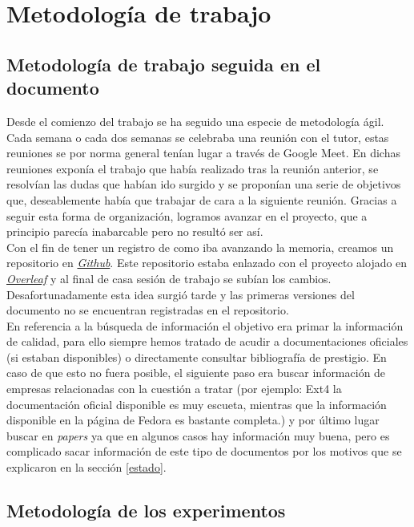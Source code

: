 \cleardoublepage
\clearpage{}

\chapter[Metodología de trabajo]{Metodología de trabajo}
\section{Metodología de trabajo seguida en el documento}
Desde el comienzo del trabajo se ha seguido una especie de metodología ágil. Cada semana o cada dos semanas se celebraba una reunión con el tutor, estas reuniones se por norma general tenían lugar a través de Google Meet. En dichas reuniones exponía el trabajo que había realizado tras la reunión anterior, se resolvían las dudas que habían ido surgido y se proponían una serie de objetivos que, deseablemente había que trabajar de cara a la siguiente reunión. Gracias a seguir esta forma de organización, logramos avanzar en el proyecto, que a principio parecía inabarcable pero no resultó ser así. \\

Con el fin de tener un registro de como iba avanzando la memoria, creamos un repositorio en \href{http://www.github.com}{\textit{Github}}. Este repositorio estaba enlazado con el proyecto alojado en \href{http://www.overleaf.com}{\textit{Overleaf}} y al final de casa sesión de trabajo se subían los cambios. Desafortunadamente esta idea surgió tarde y las primeras versiones del documento no se encuentran registradas en el repositorio.\\

En referencia a la búsqueda de información el objetivo era primar la información de calidad, para ello siempre hemos tratado de acudir a documentaciones oficiales (si estaban disponibles) o directamente consultar bibliografía de prestigio. En caso de que esto no fuera posible, el siguiente paso era buscar información de empresas relacionadas con la cuestión a tratar (por ejemplo: Ext4 la documentación oficial disponible es muy escueta, mientras que la información disponible en la página de Fedora es bastante completa.) y por último lugar buscar en \textit{papers} ya que en algunos casos hay información muy buena, pero es complicado sacar información de este tipo de documentos por los motivos que se explicaron en la sección \ref{estado}.

\section{Metodología de los experimentos}

